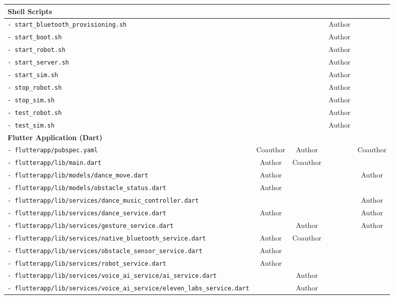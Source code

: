 \documentclass[11pt,a4paper]{article}
\begin{document}
\begin{longtable}{|p{}|c|c|c|c|}
\hline
\multicolumn{5}{|l|}{\textbf{Shell Scripts}} \\
\hline
\texttt{- start\_bluetooth\_provisioning.sh} & & &Author& \\
\texttt{- start\_boot.sh} & & &Author & \\
\texttt{- start\_robot.sh} & & &Author& \\
\texttt{- start\_server.sh} & & & Author& \\
\texttt{- start\_sim.sh} & & &Author& \\
\texttt{- stop\_robot.sh} & & &Author& \\
\texttt{- stop\_sim.sh} & & & Author& \\
\texttt{- test\_robot.sh} & & &Author& \\
\texttt{- test\_sim.sh} & & &Author& \\
\hline
\multicolumn{5}{|l|}{\textbf{Flutter Application (Dart)}} \\
\hline
\texttt{- flutterapp\slash pubspec.yaml} & Coauthor & Author & & Coauthor \\
\texttt{- flutterapp\slash lib\slash main.dart} & Author & Coauthor & & \\
\texttt{- flutterapp\slash lib\slash models\slash dance\_move.dart} & Author & & & Author \\
\texttt{- flutterapp\slash lib\slash models\slash obstacle\_status.dart} & Author & & & \\
\texttt{- flutterapp\slash lib\slash services\slash dance\_music\_controller.dart} & & & & Author \\
\texttt{- flutterapp\slash lib\slash services\slash dance\_service.dart} & Author & & & Author\\
\texttt{- flutterapp\slash lib\slash services\slash gesture\_service.dart} & & Author & & Author\\
\texttt{- flutterapp\slash lib\slash services\slash native\_bluetooth\_service.dart} & Author & Coauthor & & \\
\texttt{- flutterapp\slash lib\slash services\slash obstacle\_sensor\_service.dart} & Author & & & \\
\texttt{- flutterapp\slash lib\slash services\slash robot\_service.dart} & Author & & & \\
\texttt{- flutterapp\slash lib\slash services\slash voice\_ai\_service\slash ai\_service.dart} & & Author & & \\
\texttt{- flutterapp\slash lib\slash services\slash voice\_ai\_service\slash eleven\_labs\_service.dart} & & Author & & \\

\end{longtable}
\end{document}
